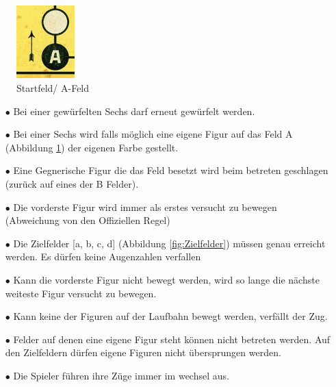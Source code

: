 \documentclass[a4paper,11pt,ngerman]{scrartcl}
\begin{document}
\begin{figure} 
	\includegraphics[width=0.2\textwidth]{start}
	\centering
	\caption{Startfeld/ A-Feld}
	\label{fig:Startfeld}
\end{figure}

\begin{enumerate}
	
	\item [$\bullet$] Bei einer gewürfelten Sechs darf erneut gewürfelt werden.
	\item [$\bullet$]Bei einer Sechs wird falls möglich eine eigene Figur auf das Feld A (Abbildung \ref{fig:Startfeld}) der eigenen Farbe gestellt.
	\item [$\bullet$] Eine Gegnerische Figur die das Feld besetzt wird beim betreten geschlagen (zurück auf eines der B Felder).
	\item [$\bullet$] Die vorderste Figur wird immer als erstes versucht zu bewegen (Abweichung von den Offiziellen Regel)
	\item [$\bullet$] Die Zielfelder [a, b, c, d] (Abbildung \ref{fig:Zielfelder}) müssen genau erreicht werden. Es dürfen keine \glqq Augenzahlen \grqq verfallen
	\item [$\bullet$] Kann die vorderste Figur nicht bewegt werden, wird so lange die nächste weiteste Figur versucht zu bewegen.
	\item [$\bullet$] Kann keine der Figuren auf der \glqq Laufbahn \grqq bewegt werden, verfällt der Zug.
	\item [$\bullet$] Felder auf denen eine eigene Figur steht können nicht betreten werden. Auf den Zielfeldern dürfen eigene Figuren nicht übersprungen werden.
	\item [$\bullet$] Die Spieler führen ihre Züge immer im wechsel aus.
\end{enumerate}
\end{document}
